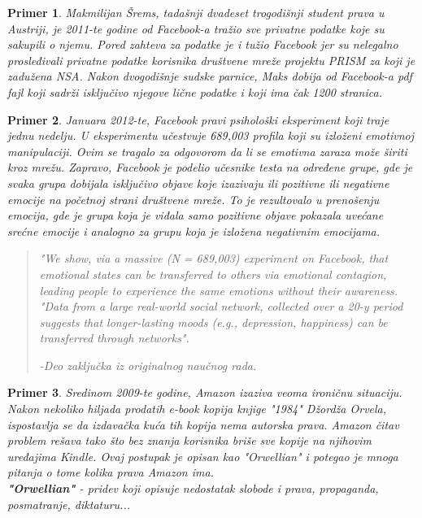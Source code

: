 \documentclass[a4paper]{article}
\newtheorem{primer}{Primer}[section]
\begin{document}
\begin{primer}
	Makmilijan Šrems, tadašnji dvadeset trogodišnji student prava u
Austriji, je 2011-te godine od Facebook-a tražio sve privatne podatke koje su sakupili o njemu. Pored zahteva za podatke je i tužio Facebook jer su nelegalno prosleđivali privatne podatke korisnika društvene mreže projektu PRISM\cite{noPlaceToHide} za koji je zadužena NSA. Nakon dvogodišnje sudske parnice, Maks dobija od Facebook-a pdf fajl koji sadrži isključivo njegove lične podatke i koji ima čak 1200 stranica. \cite{marxSchremsFT}
\end{primer}

\begin{primer}
	Januara 2012-te, Facebook pravi psihološki eksperiment koji 
traje jednu nedelju. U eksperimentu učestvuje 689,003 profila koji su izloženi emotivnoj manipulaciji. Ovim se tragalo za odgovorom da li se emotivna zaraza može širiti kroz mrežu. Zapravo, Facebook je podelio učesnike testa na određene grupe, gde je svaka grupa dobijala isključivo objave koje izazivaju ili pozitivne ili negativne emocije na početnoj strani društvene mreže. To je rezultovalo u prenošenju emocija, gde je grupa koja je viđala samo pozitivne objave pokazala uvećane srećne emocije i analogno 	za grupu koja je izložena negativnim emocijama. \cite{facebookExperiment}
\begin{quotation}
	\textit{"We show, via a massive (N = 689,003) experiment on Facebook, that emotional states can be transferred to others via emotional contagion, leading people to experience the same emotions without their awareness.
"Data from a large real-world social network, collected over a 20-y period suggests that longer-lasting moods (e.g., depression, happiness) can be transferred through networks".}
\begin{flushright}
-\em{Deo zaključka iz originalnog naučnog rada.} \cite{facebookExperiment}
\end{flushright}
\end{quotation}
\end{primer}

\begin{primer}
	Sredinom 2009-te godine, Amazon izaziva veoma ironičnu 
situaciju. Nakon nekoliko hiljada prodatih e-book kopija knjige "1984" Džordža Orvela, ispostavlja se da izdavačka kuća tih kopija nema autorska prava. Amazon čitav problem rešava tako što bez znanja korisnika briše sve kopije na njihovim uređajima Kindle. Ovaj postupak je opisan kao "Orwellian" i potegao je mnoga pitanja o tome kolika prava Amazon ima. \cite{dataAndGoliath} \\
\textbf{"Orwellian"} - \textit{pridev koji opisuje nedostatak slobode i prava, propaganda, posmatranje, diktaturu...}\\
\end{primer}
\end{document}
